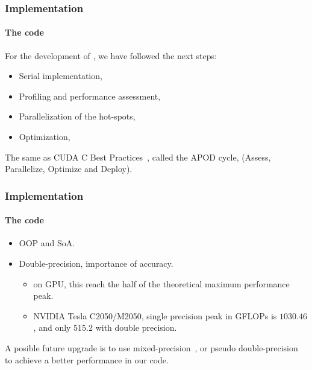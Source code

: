 \begin{frame}
    \frametitle{Implementation}
    \framesubtitle{The code}

    For the development of \GR, we have followed the next steps:

    \begin{itemize}
        \item Serial implementation,
        \item Profiling and performance assessment,
        \item Parallelization of the hot-spots,
        \item Optimization,
    \end{itemize}

    \begin{block}{}
        The same as CUDA C Best Practices~\cite{cudaBestPractices},
        called the APOD cycle, (Assess, Parallelize, Optimize and Deploy).
    \end{block}
\end{frame}


\begin{frame}
    \frametitle{Implementation}
    \framesubtitle{The code}

    \begin{itemize}
        \item OOP and SoA.
        \item Double-precision, importance of accuracy.
        \begin{itemize}
            \item on GPU, this reach the half of the theoretical maximum performance peak.
            \item NVIDIA Tesla C2050/M2050, single precision peak in GFLOPs is $1030.46$,
            and only $515.2$ with double precision.
        \end{itemize}
    \end{itemize}

    \begin{block}{}
        A posible future upgrade is to use mixed-precision~\cite{Aarseth85},
        or pseudo double-precision~\cite{keigo} to achieve a better performance
        in our code.
    \end{block}

\end{frame}

%


